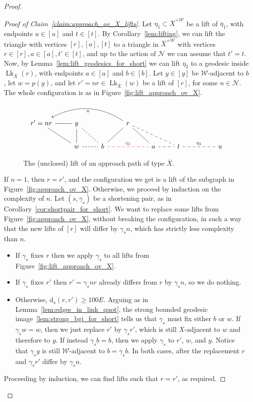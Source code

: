 \documentclass[svgnames]{amsart}
\theoremstyle{plain}
\theoremstyle{definition}
\newenvironment{claimproof}{\renewcommand{\qedsymbol}{$\blacksquare$}\begin{proof}}{\end{proof}}
\newcommand{\ov}[1]{\overline{#1}}
\newcommand{\dist}{\mathrm{d}}
\newcommand{\link}{\operatorname{Lk}}
\newcommand{\N}{\mathcal{N}}
\newcommand{\W}{\mathcal{W}}
\begin{document}
\begin{proof}
\begin{claimproof}[Proof of Claim~\ref{claim:approach_ov_X_lifts}]
    Let $\eta_1\subset \ov X^{+\W}$ be a lift of $\ov \eta_1$, with endpoints $u\in [u]$ and $t\in [t]$. By Corollary~\ref{lem:lifting}, we can lift the triangle with vertices $[r], [a], [t]$ to a triangle in $\ov X^{+\W}$ with vertices $r\in [r], a\in [a], t'\in [t]$, and up to the action of $\N$ we can assume that $t'=t$. Now, by Lemma~\ref{lem:lift_geodesics_for_short} we can lift $\ov\eta_2$ to a geodesic inside $\link_{\ov X}(r)$, with endpoints $a\in [a]$ and $b\in [b]$. Let $y\in [y]$ be $\W$-adjacent to $b$, let $w=p(y)$, and let $r'=nr\in \link_{\ov X}(w)$ be a lift of $[r]$, for some $n\in \N$. The whole configuration is as in Figure~\eqref{fig:lift_approach_ov_X}. 
    \begin{figure}[htp]
    \centering
    $$\begin{tikzcd}
        r'=nr\ar[r, no head] \ar[dr, no head] &{y}\ar[rd, dashed, no head]
        &&{r}\ar[lll, bend right, "n"] \ar[dl, no head]  \ar[dr, no head] \ar[drr, no head, dash dot]\\
        &{w} \ar[r, dashed, no head] \ar[u, no head]& {b} \ar[rr, dash dot, red, no head, "\eta_2"]&&{a}\ar[r, no head, dash dot]& {t}\ar[rr, dash dot, no head, "\eta_1"] && {u}
    \end{tikzcd}$$
    \caption{The (unclosed) lift of an approach path of type $\ov X$.}
    \label{fig:lift_approach_ov_X}
\end{figure}

    If $n=1$, then $r=r'$, and the configuration we get is a lift of the subgraph in Figure~\eqref{fig:approach_ov_X}. Otherwise, we proceed by induction on the complexity of $n$. Let $(s, \gamma_s)$ be a shortening pair, as in Corollary~\ref{cor:shortpair_for_short}. We want to replace some lifts from Figure~\eqref{fig:approach_ov_X}, without breaking the configuration, in such a way that the new lifts of $[r]$ will differ by $\gamma_s n$, which has strictly less complexity than $n$. 
    \begin{itemize}
        \item If $\gamma_s$ fixes $r$ then we apply $\gamma_s$ to all lifts from Figure~\eqref{fig:lift_approach_ov_X}.
        \item If $\gamma_s$ fixes $r'$ then $r'=\gamma_s nr$ already differs from $r$ by $\gamma_sn$, so we do nothing.
        \item Otherwise, $\dist_s(r, r')\ge 100E$. Arguing as in Lemma~\ref{lem:edges_in_link_quot}, the strong bounded geodesic image~\ref{lem:strong_bgi_for_short} tells us that $\gamma_s$ must fix either $b$ or $w$. If $\gamma_s w=w$, then we just replace $r'$ by $\gamma_s r'$, which is still $X$-adjacent to $w$ and therefore to $y$. If instead $\gamma_s b=b$, then we apply $\gamma_s$ to $r'$, $ w$, and $y$. Notice that $\gamma_s y$ is still $\W$-adjacent to $b=\gamma_s b$. In both cases, after the replacement $r$ and $\gamma_sr'$ differ by $\gamma_s n$.
    \end{itemize}
    Proceeding by induction, we can find lifts such that $r=r'$, as required.
\end{claimproof}


\end{proof}
\end{document}
